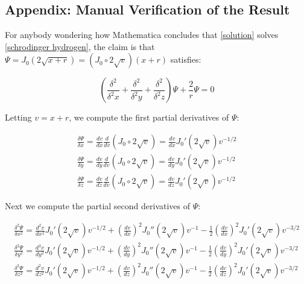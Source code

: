 \documentclass{article}
\begin{document}
\vfill\eject
\subsection*{Appendix: Manual Verification of the Result}
For anybody wondering how Mathematica concludes that \eqref{solution} solves \eqref{schrodinger hydrogen},
the claim is that $\Psi = J_0(2\sqrt{x+r}) = (J_0 \circ 2\sqrt{v}) (x+r)$ satisfies:

\begin{equation}
\label{claim}
\left(\frac{\delta^2}{\delta^2 x} + \frac{\delta^2}{\delta^2 y} + \frac{\delta^2}{\delta^2 z}\right) \Psi + \frac{2}{r}\Psi = 0
\end{equation}

\vskip 12pt

Letting $v=x+r$, we compute the first partial derivatives of $\Psi$:

\begin{equation}
\begin{gathered}
\frac{\delta \Psi}{\delta x} = \frac{d v}{d x} \frac{d}{d v} \left(J_0 \circ 2\sqrt{v}\right) = \frac{d v}{d x} J_0'(2\sqrt{v}) v^{-1/2} \\
\frac{\delta \Psi}{\delta y} = \frac{d v}{d y} \frac{d}{d v} \left(J_0 \circ 2\sqrt{v}\right) = \frac{d v}{d y} J_0'(2\sqrt{v}) v^{-1/2} \\
\frac{\delta \Psi}{\delta z} = \frac{d v}{d z} \frac{d}{d v} \left(J_0 \circ 2\sqrt{v}\right) = \frac{d v}{d z} J_0'(2\sqrt{v}) v^{-1/2}
\end{gathered}
\end{equation}

\vskip 12pt

Next we compute the partial second derivatives of $\Psi$:

\begin{equation}
\label{second partials}
\begin{gathered}
\frac{\delta^2 \Psi}{\delta x^2} = \frac{d^2 v}{d x^2} J_0'(2\sqrt{v}) v^{-1/2} + \left(\frac{d v}{d x}\right)^2 J_0''(2\sqrt{v}) v^{-1} - \frac{1}{2} \left(\frac{d v}{d x}\right)^2 J_0'(2\sqrt{v}) v^{-3/2} \\
\frac{\delta^2 \Psi}{\delta y^2} = \frac{d^2 v}{d y^2} J_0'(2\sqrt{v}) v^{-1/2} + \left(\frac{d v}{d y}\right)^2 J_0''(2\sqrt{v}) v^{-1} - \frac{1}{2} \left(\frac{d v}{d y}\right)^2 J_0'(2\sqrt{v}) v^{-3/2} \\
\frac{\delta^2 \Psi}{\delta z^2} = \frac{d^2 v}{d z^2} J_0'(2\sqrt{v}) v^{-1/2} + \left(\frac{d v}{d z}\right)^2 J_0''(2\sqrt{v}) v^{-1} - \frac{1}{2} \left(\frac{d v}{d z}\right)^2 J_0'(2\sqrt{v}) v^{-3/2}
\end{gathered}
\end{equation}
\end{document}
